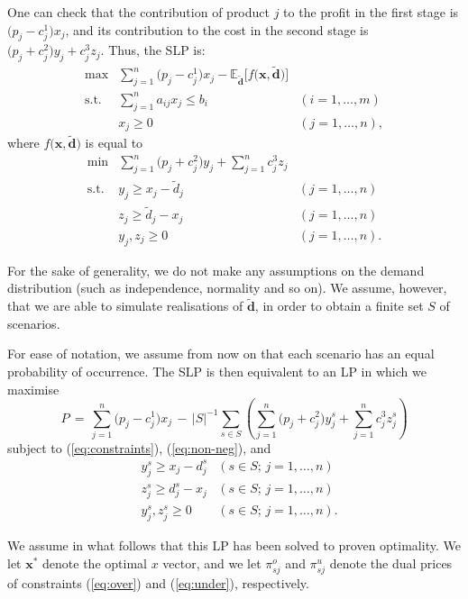 \documentclass[a4paper,11pt]{article}
\begin{document}
One can check that the contribution of product $j$ to the profit in the first stage is $\big( p_j - c^1_j \big) x_j$, and its contribution to the cost in the second stage is $\big( p_j + c^2_j \big) y_j + c^3_j z_j$. Thus, the SLP is:
\begin{eqnarray}
\nonumber
\max & \sum_{j=1}^n \big( p_j - c^1_j \big) x_j -
  \mathbb{E}_{\mathbf{\tilde d}}
  \Big[ f \big( \mathbf{x}, \mathbf{{\tilde d}} \big) \Big] \\
\label{eq:constraints}
\mbox{s.t.} & \sum_{j=1}^n a_{ij} x_j \le b_i & (i = 1, \ldots, m) \\
\label{eq:non-neg} & x_j \ge 0 & (j = 1, \ldots, n),
\end{eqnarray}
where $f \big( \mathbf{x}, \mathbf{{\tilde d}} \big)$ is equal to
\begin{eqnarray*}
\min        & \sum_{j=1}^n \big( p_j + c^2_j \big) y_j +
              \sum_{j=1}^n c^3_j z_j \\
\text{s.t.} & y_j \ge x_j - {\tilde d}_j & (j = 1, \ldots, n) \\
            & z_j \ge {\tilde d}_j - x_j & (j = 1, \ldots, n) \\
            & y_j, z_j \ge 0    & (j = 1, \ldots, n).
\end{eqnarray*}

For the sake of generality, we do not make any assumptions on the demand distribution (such as independence, normality and so on). We assume, however, that we are able to simulate realisations of $\mathbf{\tilde d}$, in order to obtain a finite set $S$ of scenarios.

For ease of notation, we assume from now on that each scenario has an equal probability of occurrence. The SLP is then equivalent to an LP in which we maximise
\[
P \, = \, \sum_{j=1}^n \big( p_j - c^1_j \big) x_j \, - \,
|S|^{-1} \sum_{s \in S} \left( \sum_{j=1}^n \big( p_j + c^2_j \big) y_j^s
+ \sum_{j=1}^n c^3_j z_j^s \right)
\]
subject to (\ref{eq:constraints}), (\ref{eq:non-neg}), and
\begin{eqnarray}
\label{eq:over}	& y_j^s \ge x_j - d_j^s & (s \in S; \, j = 1, \ldots, n) \\
\label{eq:under} & z_j^s \ge d_j^s - x_j & (s \in S; \, j = 1, \ldots, n) \\
\nonumber
& y_j^s, z_j^s \ge 0	& (s \in S; \, j = 1, \ldots, n).
\end{eqnarray}

We assume in what follows that this LP has been solved to proven optimality. We let $\mathbf{x}^*$ denote the optimal $x$ vector, and we let $\pi_{sj}^o$ and $\pi_{sj}^u$ denote the dual prices of constraints (\ref{eq:over}) and (\ref{eq:under}), respectively.
\end{document}
